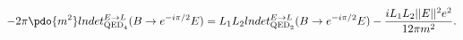 \begin{equation}
\label{Eq_0605}
-2\pi \pdo{m^2} lndet^{E \to L}_{\text{QED}_4} (B \to e^{-i\pi/2}E)
  = L_1 L_2 lndet^{E \to L}_{\text{QED}_2} (B \to e^{-i\pi/2} E)
    - \frac{i L_1 L_2 ||E||^2 e^2}{12 \pi m^2}.
\end{equation}

